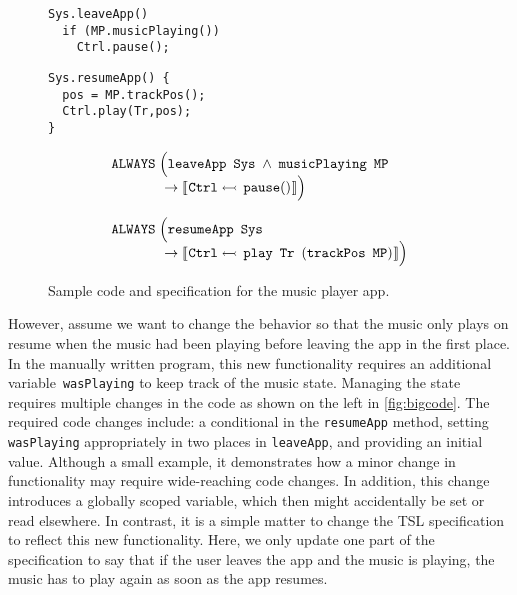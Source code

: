 \begin{figure}[t]
\vspace{-1em}
\begin{minipage}{.42\textwidth}
  \vspace{-0.8em}
\begin{lstlisting}
Sys.leaveApp()
  if (MP.musicPlaying())
    Ctrl.pause();
\end{lstlisting}
\vspace{-1em}
\begin{lstlisting}
Sys.resumeApp() {
  pos = MP.trackPos();
  Ctrl.play(Tr,pos);
}
\end{lstlisting}
\vspace{-0.8em}
\end{minipage}%
\vrule{}%
\begin{minipage}{.59\textwidth}
\vspace{-0.8em}
\begin{align*}
& {\text{\texttt{ALWAYS}}} \; \Big({\text{\texttt{leaveApp}}} \ \, {\text{\texttt{Sys}}} \; \wedge \; {\text{\texttt{musicPlaying}}} \ \, {\text{\texttt{MP}}} \\[-0.5em]
& \quad \hspace{2.5em} \rightarrow \llbracket \hspace{0.5pt} {\text{\texttt{Ctrl}}} \leftarrowtail \, \text{\texttt{pause}}() \hspace{0.5pt} \rrbracket \Big) \\[0.8em]
& {\text{\texttt{ALWAYS}}} \; \Big({\text{\texttt{resumeApp}}} \ \, {\text{\texttt{Sys}}}  \\[-0.5em]
& \quad \hspace{2.5em} \rightarrow  \llbracket \hspace{0.5pt} {\text{\texttt{Ctrl}}} \leftarrowtail \, {\text{\texttt{play}}} \ \, {\text{\texttt{Tr}}} \ \, ({\text{\texttt{trackPos}}} \ \, {\text{\texttt{MP}}}) \hspace{0.5pt} \rrbracket \Big)
\end{align*}
\vspace{-0.8em}
\end{minipage}
\vspace{-0.5em}
\caption{Sample code and specification for the music player app.}
\label{fig:smallcode}
\end{figure}
%
However, assume we want to change the behavior so that the music only plays on resume when the music had been playing before leaving the app in the first place.
In the manually written program, this new functionality requires an additional variable~\texttt{wasPlaying} to keep track of the music state.
Managing the state requires multiple changes in the code as shown on the left in \cref{fig:bigcode}.
The required code changes include: a conditional in the \texttt{resumeApp} method, setting \texttt{wasPlaying} appropriately in two places in \texttt{leaveApp}, and providing an initial value.
Although a small example, it demonstrates how a minor change in functionality may require wide-reaching code changes.
In addition, this change introduces a globally scoped variable, which then might accidentally be set or read elsewhere.
%
In contrast, it is a simple matter to change the TSL specification to reflect this new functionality.
Here, we only update one part of the specification to say that if the user leaves the app and the music is playing, the music has to play again as soon as the app resumes.


